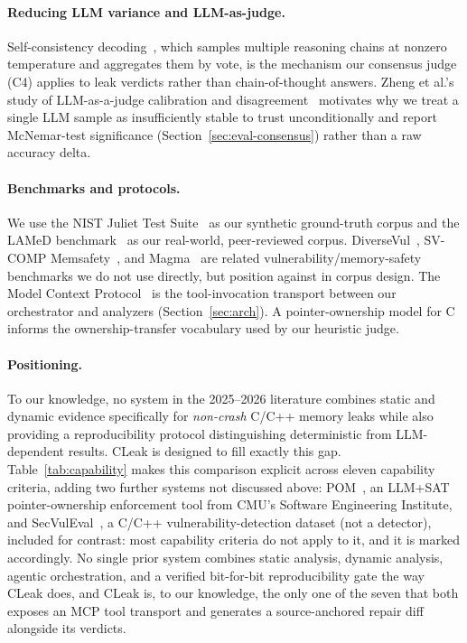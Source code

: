 \documentclass[11pt,a4paper]{article}
\begin{document}
\paragraph{Reducing LLM variance and LLM-as-judge.}
Self-consistency decoding~\cite{selfconsistency}, which samples multiple
reasoning chains at nonzero temperature and aggregates them by vote, is the
mechanism our consensus judge (C4) applies to leak verdicts rather than
chain-of-thought answers. Zheng et al.'s study of LLM-as-a-judge
calibration and disagreement~\cite{llmjudge} motivates why we treat a
single LLM sample as insufficiently stable to trust unconditionally and
report McNemar-test significance (Section~\ref{sec:eval-consensus}) rather
than a raw accuracy delta.

\paragraph{Benchmarks and protocols.}
We use the NIST Juliet Test Suite~\cite{juliet} as our synthetic
ground-truth corpus and the LAMeD benchmark~\cite{lamed-benchmark} as our
real-world, peer-reviewed corpus. DiverseVul~\cite{diversevul},
SV-COMP Memsafety~\cite{svcomp}, and Magma~\cite{magma} are related
vulnerability/memory-safety benchmarks we do not use directly, but position
against in corpus design. The Model Context Protocol~\cite{mcp} is the
tool-invocation transport between our orchestrator and analyzers
(Section~\ref{sec:arch}). A pointer-ownership model for
C~\cite{ownership-model} informs the ownership-transfer vocabulary used by
our heuristic judge.

\paragraph{Positioning.} To our knowledge, no system in the 2025--2026
literature combines static and dynamic evidence specifically for
\emph{non-crash} C/C++ memory leaks while also providing a reproducibility
protocol distinguishing deterministic from LLM-dependent results. CLeak is
designed to fill exactly this gap. Table~\ref{tab:capability} makes this
comparison explicit across eleven capability criteria, adding two further
systems not discussed above: POM~\cite{pom}, an LLM+SAT pointer-ownership
enforcement tool from CMU's Software Engineering Institute, and
SecVulEval~\cite{secvuleval}, a C/C++ vulnerability-detection dataset
(not a detector), included for contrast: most capability criteria do not
apply to it, and it is marked accordingly. No single
prior system combines static analysis,
dynamic analysis, agentic orchestration, and a verified bit-for-bit
reproducibility gate the way CLeak does, and CLeak is, to our knowledge,
the only one of the seven that both exposes an MCP tool transport and
generates a source-anchored repair diff alongside its verdicts.
\end{document}
